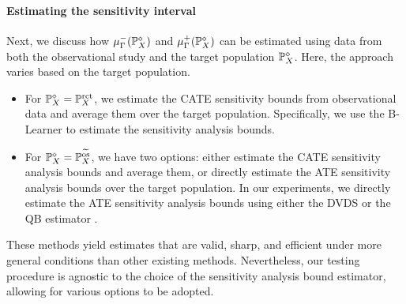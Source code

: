 \paragraph{Estimating the sensitivity interval} Next, we discuss how $\mu_\Gamma^-(\mathbb{P} ^{\diamond}_X)$ and $\mu_\Gamma^+(\mathbb{P} ^{\diamond}_X)$ can be estimated using data from both the observational study and the target population $\mathbb{P} ^{\diamond}_X$. Here, the approach varies based on the target population.
\begin{itemize}[leftmargin=*]
	\item For $\mathbb{P} ^{\diamond}_X = \mathbb{P}^{\operatorname{rct}}_X$, we estimate the CATE sensitivity bounds from observational data and average them over the target population. Specifically, we use the B-Learner \citep{oprescu2023b} to estimate the sensitivity analysis bounds.
	\item For $\mathbb{P} ^{\diamond}_X = \mathbb{P}^{\widetilde{\mathrm{os}}}_X$, we have two options: either estimate the CATE sensitivity analysis bounds and average them, or directly estimate the ATE sensitivity analysis bounds over the target population.  In our experiments, we directly estimate the ATE sensitivity analysis bounds using either the DVDS \citep{dorn2021doubly} or the QB estimator \citep{dorn2022sharp}.
\end{itemize}   

These methods yield estimates that are valid, sharp, and efficient under more general conditions than other existing methods. Nevertheless, our testing procedure is agnostic to the choice of the sensitivity analysis bound estimator, allowing for various options to be adopted. 


